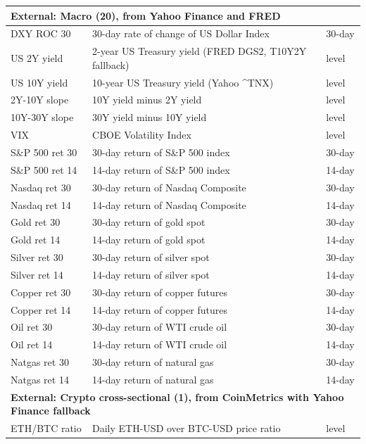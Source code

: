 \documentclass[12pt,a4paper,oneside]{article}
\begin{document}
\begin{longtable}{p{3.5cm}p{7cm}p{2.5cm}}
\midrule
\multicolumn{3}{l}{\textbf{External: Macro (20), from Yahoo Finance and FRED}} \\
\midrule
DXY ROC 30 & 30-day rate of change of US Dollar Index & 30-day \\
US 2Y yield & 2-year US Treasury yield (FRED DGS2, T10Y2Y fallback) & level \\
US 10Y yield & 10-year US Treasury yield (Yahoo \textasciicircum TNX) & level \\
2Y-10Y slope & 10Y yield minus 2Y yield & level \\
10Y-30Y slope & 30Y yield minus 10Y yield & level \\
VIX & CBOE Volatility Index & level \\
S\&P 500 ret 30 & 30-day return of S\&P 500 index & 30-day \\
S\&P 500 ret 14 & 14-day return of S\&P 500 index & 14-day \\
Nasdaq ret 30 & 30-day return of Nasdaq Composite & 30-day \\
Nasdaq ret 14 & 14-day return of Nasdaq Composite & 14-day \\
Gold ret 30 & 30-day return of gold spot & 30-day \\
Gold ret 14 & 14-day return of gold spot & 14-day \\
Silver ret 30 & 30-day return of silver spot & 30-day \\
Silver ret 14 & 14-day return of silver spot & 14-day \\
Copper ret 30 & 30-day return of copper futures & 30-day \\
Copper ret 14 & 14-day return of copper futures & 14-day \\
Oil ret 30 & 30-day return of WTI crude oil & 30-day \\
Oil ret 14 & 14-day return of WTI crude oil & 14-day \\
Natgas ret 30 & 30-day return of natural gas & 30-day \\
Natgas ret 14 & 14-day return of natural gas & 14-day \\

\midrule
\multicolumn{3}{l}{\textbf{External: Crypto cross-sectional (1), from CoinMetrics with Yahoo Finance fallback}} \\
\midrule
ETH/BTC ratio & Daily ETH-USD over BTC-USD price ratio & level \\


\end{longtable}
\end{document}
